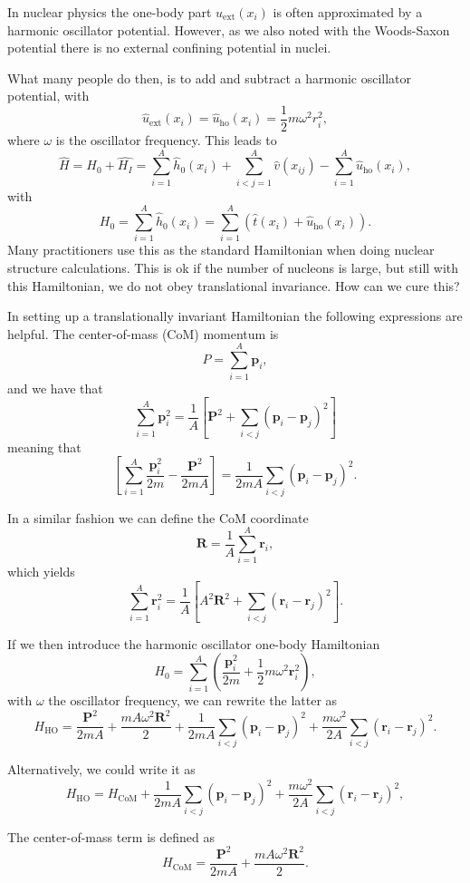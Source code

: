 \documentclass[%
twoside,                 %
final,                   %
10pt]{article}
\begin{document}
In nuclear physics the one-body part $u_{\mathrm{ext}}(x_i)$ is often 
approximated by a harmonic oscillator potential. However,  as we also noted with the Woods-Saxon potential there is no 
external confining potential in nuclei. 

What many people do then, is to add and subtract a harmonic oscillator potential,
with 
\[
\hat{u}_{\mathrm{ext}}(x_i)=\hat{u}_{\mathrm{ho}}(x_i)= \frac{1}{2}m\omega^2 r_i^2,
\]
where $\omega$ is the oscillator frequency. This leads to 
\[
    \hat{H} = \hat{H_0} + \hat{H_I} 
    = \sum_{i=1}^A \hat{h}_0(x_i) + \sum_{i < j=1}^A \hat{v}(x_{ij})-\sum_{i=1}^A\hat{u}_{\mathrm{ho}}(x_i),
\]
with 
\[
  H_0=\sum_{i=1}^A \hat{h}_0(x_i) =  \sum_{i=1}^A\left(\hat{t}(x_i) + \hat{u}_{\mathrm{ho}}(x_i)\right).
\]
Many practitioners use this as the standard Hamiltonian when doing nuclear structure calculations. 
This is ok if the number of nucleons is large, but still with this Hamiltonian, we do not obey translational invariance.  How can we cure this?


 In setting up a translationally invariant Hamiltonian  
 the following expressions are helpful.
 The center-of-mass (CoM)  momentum is
\[
    P=\sum_{i=1}^A\bm{p}_i,
 \]
 and we have that
\[
 \sum_{i=1}^A\bm{p}_i^2 =
 \frac{1}{A}\left[\bm{P}^2+\sum_{i < j}(\bm{p}_i-\bm{p}_j)^2\right]
 \]
 meaning that
\[
 \left[\sum_{i=1}^A\frac{\bm{p}_i^2}{2m} -\frac{\bm{P}^2}{2mA}\right]
 =\frac{1}{2mA}\sum_{i < j}(\bm{p}_i-\bm{p}_j)^2.
 \]

 In a similar fashion we can define the CoM coordinate
\[
     \bm{R}=\frac{1}{A}\sum_{i=1}^{A}\bm{r}_i,
 \]
 which yields
 \[
 \sum_{i=1}^A\bm{r}_i^2 =
 \frac{1}{A}\left[A^2\bm{R}^2+\sum_{i < j}(\bm{r}_i-\bm{r}_j)^2\right].
 \]


 If we then introduce the harmonic oscillator one-body Hamiltonian
\[
      H_0= \sum_{i=1}^A\left(\frac{\bm{p}_i^2}{2m}+
	   \frac{1}{2}m\omega^2\bm{r}_i^2\right),
 \]
 with $\omega$ the oscillator frequency,
 we can rewrite the latter as 
 \[
      H_{\mathrm{HO}}= \frac{\bm{P}^2}{2mA}+\frac{mA\omega^2\bm{R}^2}{2}
	    +\frac{1}{2mA}\sum_{i < j}(\bm{p}_i-\bm{p}_j)^2
	    +\frac{m\omega^2}{2A}\sum_{i < j}(\bm{r}_i-\bm{r}_j)^2.
     \label{eq:obho}
 \]

Alternatively, we could write it as	
\[
 H_{\mathrm{HO}}= H_{\mathrm{CoM}}+\frac{1}{2mA}\sum_{i < j}(\bm{p}_i-\bm{p}_j)^2
	    +\frac{m\omega^2}{2A}\sum_{i < j}(\bm{r}_i-\bm{r}_j)^2,
 \]

The center-of-mass term is defined as
 \[
      H_{\mathrm{CoM}}= \frac{\bm{P}^2}{2mA}+\frac{mA\omega^2\bm{R}^2}{2}.
 \]
\end{document}
